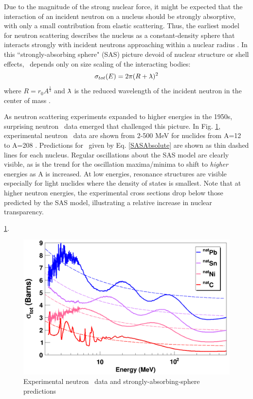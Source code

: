 Due to the magnitude of the strong nuclear force, it might be expected that 
the interaction of an incident neutron on a nucleus should be strongly
absorptive, with only a small contribution from elastic scattering. Thus, the
earliest model for neutron scattering describes the nucleus as a constant-density
sphere that interacts strongly with incident neutrons approaching within a nuclear radius
\cite{Feshbach1949}. In this ``strongly-absorbing sphere" (SAS) picture devoid of nuclear structure
or shell effects, \tot\ depends only on size scaling of the interacting bodies:
\begin{equation} \label{SASAbsolute}
    \sigma_{tot}(E) = 2\pi(R + \lambdabar)^{2}
\end{equation}
where $R=r_{0}A^{\frac{1}{3}}$ and $\lambdabar$ is the reduced wavelength
of the incident neutron in the center of mass \cite{Fernbach1949, Satchler1980}. 

As neutron scattering experiments expanded to higher energies in the 1950s, surprising 
neutron \tot\ data emerged that challenged this picture. In Fig.
\ref{SASphereVsExperiment}, experimental neutron \tot\ data are shown from 2-500
MeV for nuclides from A=12 to A=208 \cite{Finlay1993, Schwartz1974, Poenitz1983, Abfalterer2000, 
Abfalterer2001}. Predictions for \tot\ given by Eq. \ref{SASAbsolute} are shown as thin dashed 
lines for each nucleus. Regular oscillations about the SAS model are clearly
visible, as is the trend for the oscillation maxima/minima to shift to \textit{higher} energies as 
A is increased. At low energies, resonance structures are visible especially for light nuclides 
where the density of states is smallest. Note that at higher neutron energies, the experimental
cross sections drop below those predicted by the SAS model, illustrating
a relative increase in nuclear transparency.

 \ref{SASphereVsExperiment}.

\begin{figure}
    \includegraphics[scale=0.4]{figures/SASphereVsExperiment.png}
    \caption{Experimental neutron \tot\ data and strongly-absorbing-sphere predictions}
    \label{SASphereVsExperiment}
\end{figure}

